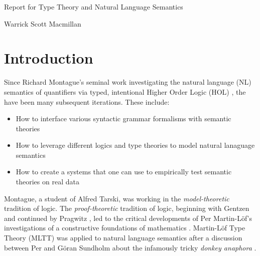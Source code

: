 \documentclass[a4paper, 11pt]{article}
\begin{document}

\begin{titlepage}

\vspace*{1cm}

\begin{center} \Large Report for Type Theory and Natural Language Semantics\\ 

\vspace{1.5cm}

\large Warrick Scott Macmillan \end{center}

\end{titlepage}

\section{Introduction} 

Since Richard Montague's seminal work investigating the natural language (NL)
semantics of quantifiers via typed, intentional Higher Order Logic (HOL)
\cite{Montague1973}, the have been many subsequent iterations. These include:

\begin{itemize}
\item How to interface various syntactic grammar formalisms with semantic theories 
\item How to leverage different logics and type theories to model natural
  lanaguage semantics
\item How to create a systems that one can use to empirically test 
  semantic theories on real data
\end{itemize}

Montague, a student of Alfred Tarski, was working in the \emph{model-theoretic}
tradition of logic. The \emph{proof-theoretic} tradition of logic, beginning
with Gentzen \cite{Gentzen1935} and continued by Pragwitz
\cite{prawitz2006natural}, led to the critical developments of Per Martin-Löf's
investigations of a constructive foundations of mathematics \cite{ml79}
\cite{ml1984}. Martin-Löf Type Theory (MLTT) was applied to natural language
semantics after a discussion between Per and Göran Sundholm about the infamously
tricky \emph{donkey anaphora} \cite{Sundholm1986}.
\end{document}
